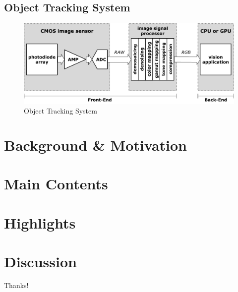 \documentclass{beamer}
\begin{document}
\subsection{Object Tracking System}

\begin{frame}
    \begin{figure}[htpb]
        \begin{center}
            \includegraphics[width=1.0\linewidth]{fig/block.pdf}
            \caption{Object Tracking System}
        \end{center}
    \end{figure}
\end{frame}

\section{Background \& Motivation}

\section{Main Contents}

\section{Highlights}

\section{Discussion}

\begin{frame}
    \begin{center}
        {\Huge\calligra Thanks!}
    \end{center}
\end{frame}
\end{document}
